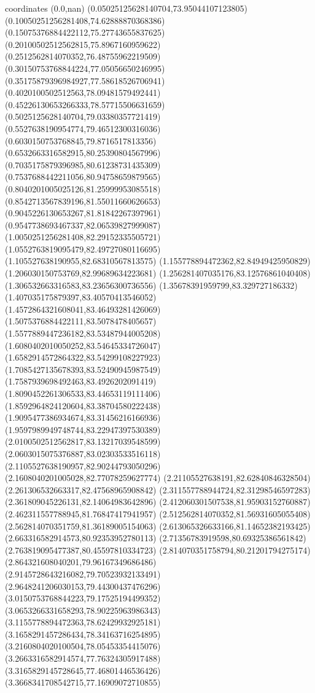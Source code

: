 coordinates {%
(0.0,nan)
(0.05025125628140704,73.95044107123805)
(0.10050251256281408,74.62888870368386)
(0.15075376884422112,75.27743655837625)
(0.20100502512562815,75.8967160959622)
(0.2512562814070352,76.48755962219509)
(0.30150753768844224,77.05056650246995)
(0.35175879396984927,77.58618526706941)
(0.4020100502512563,78.09481579492441)
(0.45226130653266333,78.57715506631659)
(0.5025125628140704,79.03380357721419)
(0.5527638190954774,79.46512300316036)
(0.6030150753768845,79.8716517813356)
(0.6532663316582915,80.25390804567996)
(0.7035175879396985,80.61238731435309)
(0.7537688442211056,80.94758659879565)
(0.8040201005025126,81.25999953085518)
(0.8542713567839196,81.55011660626653)
(0.9045226130653267,81.81842267397961)
(0.9547738693467337,82.06539827999087)
(1.0050251256281408,82.29152335505721)
(1.0552763819095479,82.49727080116695)
(1.105527638190955,82.68310567813575)
(1.155778894472362,82.84949425950829)
(1.206030150753769,82.99689634223681)
(1.256281407035176,83.12576861040408)
(1.306532663316583,83.23656300736556)
(1.35678391959799,83.329727186332)
(1.407035175879397,83.40570413546052)
(1.4572864321608041,83.46493281426069)
(1.5075376884422111,83.5078478405657)
(1.5577889447236182,83.53487944005208)
(1.6080402010050252,83.54645334726047)
(1.6582914572864322,83.54299108227923)
(1.7085427135678393,83.52490945987549)
(1.7587939698492463,83.4926202091419)
(1.8090452261306533,83.44653119111406)
(1.8592964824120604,83.38704580222438)
(1.9095477386934674,83.31456216166936)
(1.9597989949748744,83.22947397530389)
(2.0100502512562817,83.13217039548599)
(2.0603015075376887,83.02303533516118)
(2.1105527638190957,82.90244793050296)
(2.1608040201005028,82.77078259627774)
(2.21105527638191,82.62840846328504)
(2.261306532663317,82.47568965908842)
(2.311557788944724,82.31298546597283)
(2.361809045226131,82.14064983642896)
(2.412060301507538,81.95903152760887)
(2.462311557788945,81.76847417941957)
(2.512562814070352,81.56931605055408)
(2.562814070351759,81.36189005154063)
(2.613065326633166,81.14652382193425)
(2.663316582914573,80.92353952780113)
(2.71356783919598,80.69325386561842)
(2.763819095477387,80.45597810334723)
(2.814070351758794,80.21201794275174)
(2.864321608040201,79.96167349686486)
(2.9145728643216082,79.70523932133491)
(2.9648241206030153,79.44300437476296)
(3.0150753768844223,79.17525194499352)
(3.0653266331658293,78.90225963986343)
(3.1155778894472363,78.62429932925181)
(3.1658291457286434,78.34163716254895)
(3.2160804020100504,78.05453354415076)
(3.2663316582914574,77.76324305917488)
(3.3165829145728645,77.46801446536426)
(3.3668341708542715,77.16909072710855)
}
